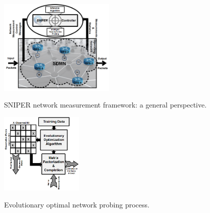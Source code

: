 \begin{figure}[t]
  \begin{center}
    {\includegraphics[keepaspectratio, width=0.49\textwidth]{GBDSNIPER_New.png}}
  \end{center}
  \caption{{SNIPER network measurement framework: a general perspective.}}
  \label{fig:GBDSNIPER}
\end{figure}
\begin{figure}[t]
  \begin{center}
    {\includegraphics[keepaspectratio, width=0.35\textwidth]{EVSmpMC.png}} \\  %
  \end{center}
  \caption{{Evolutionary optimal network probing process.}}
  \label{fig:EVSmpMC}
\end{figure}


